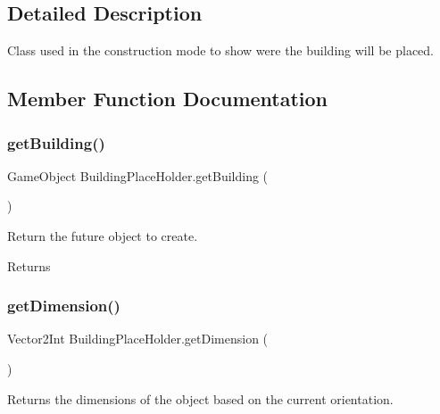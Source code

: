 \subsection{Detailed Description}
Class used in the construction mode to show were the building will be placed. 



\subsection{Member Function Documentation}
\mbox{\label{class_building_place_holder_a13c29939a115084aa9c93662933cc890}} 
\subsubsection{\texorpdfstring{get\+Building()}{getBuilding()}}
{\footnotesize\ttfamily Game\+Object Building\+Place\+Holder.\+get\+Building (\begin{DoxyParamCaption}{ }\end{DoxyParamCaption})}



Return the future object to create. 

\begin{DoxyReturn}{Returns}

\end{DoxyReturn}
\mbox{\label{class_building_place_holder_a91b51db36b78906565aeb2dd32b5db82}} 
\subsubsection{\texorpdfstring{get\+Dimension()}{getDimension()}}
{\footnotesize\ttfamily Vector2\+Int Building\+Place\+Holder.\+get\+Dimension (\begin{DoxyParamCaption}{ }\end{DoxyParamCaption})}



Returns the dimensions of the object based on the current orientation. 

